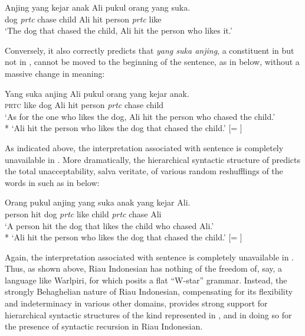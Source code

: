\documentclass[output=paper,colorlinks,citecolor=brown
]{langscibook}
\begin{document}
\ea \label{ex:gil:2}
\gll Anjing	yang	kejar	anak	Ali	pukul	orang	yang	suka.\\
 dog	\textit{prtc}	chase	child	Ali	hit	person	\textit{prtc}	like	\\
\glt `The dog that chased the child, Ali hit the person who likes it.'
\z

Conversely, it also correctly predicts that \textit{yang suka anjing}, a constituent in  but not in , cannot be moved to the beginning of the sentence, as in  below, without a massive change in meaning:

\ea \label{ex:gil:3}
\gll Yang	suka	anjing	Ali	pukul	orang	yang	kejar	anak.\\
 \textsc{prtc}	like	dog	Ali	hit	person	\textit{prtc}	chase	child\\
\glt `As for the one who likes the dog, Ali hit the person who chased the child.' \\
*	`Ali hit the person who likes the dog that chased the child.' [= ]
\z

As indicated above, the interpretation associated with sentence  is completely unavailable in .  More dramatically, the hierarchical syntactic structure of  predicts the total unacceptability, salva veritate, of various random reshufflings of the words in  such as in  below:

\ea \label{ex:gil:4}
\gll Orang	pukul	anjing	yang	suka	anak	yang	kejar	Ali. \\
    person	hit	dog	\textit{prtc}	like	child	\textit{prtc}	chase	Ali\\
\glt `A person hit the dog that likes the child who chased Ali.' \\
*	`Ali hit the person who likes the dog that chased the child.' [= ]
\z

Again, the interpretation associated with sentence  is completely unavailable in .  Thus, as shown above, Riau Indonesian has nothing of the freedom of, say, a language like Warlpiri, for which \citet{hale1979position, hale1983warlpiri} posits a flat ``W-star'' grammar. Instead, the strongly Behaghelian nature of Riau Indonesian, compensating for its flexibility and indeterminacy in various other domains, provides strong support for hierarchical syntactic structures of the kind represented in , and in doing so for the presence of syntactic recursion in Riau Indonesian.
\end{document}
